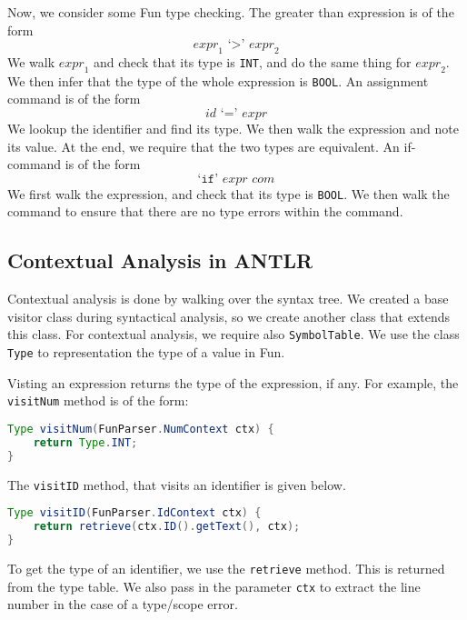 \documentclass[a4paper, openany]{memoir}
\begin{document}
Now, we consider some Fun type checking. The greater than expression is of the form
\[\textit{expr}_1 \text{ `}\texttt{>}\text{' } \textit{expr}_2\]
We walk $\textit{expr}_1$ and check that its type is \texttt{INT}, and do the same thing for $\textit{expr}_2$. We then infer that the type of the whole expression is \texttt{BOOL}. An assignment command is of the form
\[\textit{id } \text{`}\texttt{=}\text{'} \textit{ expr}\]
We lookup the identifier and find its type. We then walk the expression and note its value. At the end, we require that the two types are equivalent. An if-command is of the form
\[\text{`}\texttt{if}\text{' } \textit{expr com}\]
We first walk the expression, and check that its type is \texttt{BOOL}. We then walk the command to ensure that there are no type errors within the command.

\subsection{Contextual Analysis in ANTLR}
Contextual analysis is done by walking over the syntax tree. We created a base visitor class during syntactical analysis, so we create another class that extends this class. For contextual analysis, we require also \texttt{SymbolTable}. We use the class \texttt{Type} to representation the type of a value in Fun.

Visting an expression returns the type of the expression, if any. For example, the \texttt{visitNum} method is of the form:
\begin{lstlisting}[language=java]
Type visitNum(FunParser.NumContext ctx) {
    return Type.INT;
}
\end{lstlisting}
The \texttt{visitID} method, that visits an identifier is given below.
\begin{lstlisting}[language=java]
Type visitID(FunParser.IdContext ctx) {
    return retrieve(ctx.ID().getText(), ctx);
}
\end{lstlisting}
To get the type of an identifier, we use the \texttt{retrieve} method. This is returned from the type table. We also pass in the parameter \texttt{ctx} to extract the line number in the case of a type/scope error.
\end{document}
